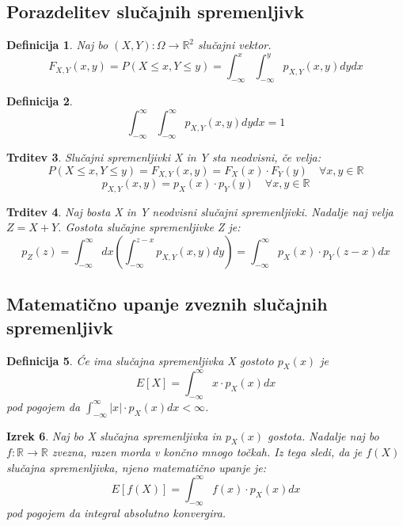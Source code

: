 \documentclass[11pt]{article}
\newtheorem{Izrek}{{\sc Izrek}}[section]
\newtheorem{Trditev}[Izrek]{{\sc Trditev}}
\newtheorem{Definicija}[Izrek]{{\sc Definicija}}
\begin{document}
\subsection{Porazdelitev slučajnih spremenljivk}
\begin{Definicija}
	Naj bo $(X,Y) : \Omega \to \mathbb{R}^2$ slučajni vektor.
	$$F_{X,Y}(x,y) = P(X\le x, Y\le y) = \int_{-\infty}^{x}\int_{-\infty}^{y}{p_{X,Y}(x,y) dy dx}$$
\end{Definicija}
\begin{Definicija}
	$$\int_{-\infty}^{\infty}\int_{-\infty}^{\infty}{p_{X,Y}(x,y) dy dx} = 1$$
\end{Definicija}
\begin{Trditev}
	Slučajni spremenljivki X in Y sta neodvisni, če velja:
	$$P(X\le x, Y\le y) =F_{X,Y}(x,y) =F_X(x) \cdot F_Y(y) \quad \forall x,y\in \mathbb{R}$$
	$$p_{X,Y} (x,y) =p_X(x) \cdot p_Y(y) \quad \forall x,y\in \mathbb{R}$$
\end{Trditev}
\begin{Trditev}
	Naj bosta X in Y neodvisni slučajni spremenljivki. Nadalje naj velja $Z = X + Y$. Gostota slučajne spremenljivke Z je:
	$$p_Z(z) = \int_{-\infty}^{\infty}{dx}\left(\int_{-\infty}^{z-x}{p_{X,Y}(x,y) dy}\right) = \int_{-\infty}^{\infty}{p_X(x)\cdot p_Y(z-x)dx}$$
\end{Trditev}
\subsection{Matematično upanje zveznih slučajnih spremenljivk}
\begin{Definicija}
Će ima slučajna spremenljivka X gostoto $p_X(x)$ je $$E[X] = \int_{-\infty}^{\infty}{x\cdot p_X(x) dx}$$  pod pogojem da $\int_{-\infty}^{\infty}{|x| \cdot p_X(x) dx} < \infty$.
\end{Definicija}
\begin{Izrek}
Naj bo X slučajna spremenljivka in $p_X(x)$ gostota. Nadalje naj bo $f: \mathbb{R} \to \mathbb{R}$ zvezna, razen morda v končno mnogo točkah. Iz tega sledi, da je $f(X)$ slučajna spremenljivka, njeno matematično upanje je:
$$E[f(X)] =  \int_{-\infty}^{\infty}{f(x)\cdot p_X(x) dx}$$
pod pogojem da integral absolutno konvergira.
\end{Izrek}
\end{document}
